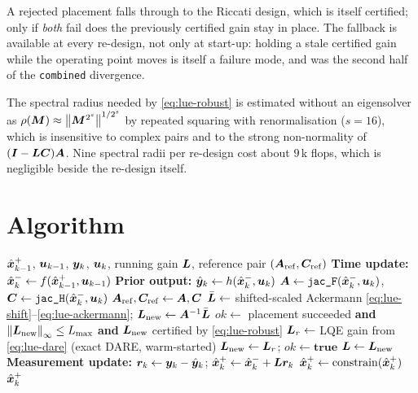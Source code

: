 A rejected placement falls through to the Riccati design, which is itself certified; only if
\emph{both} fail does the previously certified gain stay in place.  The fallback is available at
every re-design, not only at start-up: holding a stale certified gain while the operating point
moves is itself a failure mode, and was the second half of the \texttt{combined} divergence.

The spectral radius needed by \eqref{eq:lue-robust} is estimated without an eigensolver as
$\rho(\bm{M})\approx\left\lVert \bm{M}^{2^s} \right\rVert^{1/2^s}$ by repeated squaring with renormalisation ($s=16$),
which is insensitive to complex pairs and to the strong non-normality of $(\bm{I}-\bm{L}\bm{C})\bm{A}$.
Nine spectral radii per re-design cost about $9\,$k flops, which is negligible beside the
re-design itself.

\section{Algorithm}
\begin{algorithm}[H]
\caption{Luenberger --- one sampling period}
\begin{algorithmic}[1]
\Require $\hat{\bm{x}}^{+}_{k-1}$, $\bm{u}_{k-1}$, $\bm{y}_k$, $\bm{u}_k$, running gain $\bm{L}$, reference pair $(\bm{A}_{\mathrm{ref}},\bm{C}_{\mathrm{ref}})$
\State \textbf{Time update:} $\hat{\bm{x}}^{-}_k \gets f(\hat{\bm{x}}^{+}_{k-1},\bm{u}_{k-1})$
\State \textbf{Prior output:} $\hat{\bm{y}}_k \gets h(\hat{\bm{x}}^{-}_k, \bm{u}_k)$
\State $\bm{A} \gets \texttt{jac\_F}(\hat{\bm{x}}^{-}_k,\bm{u}_k)$, \quad $\bm{C} \gets \texttt{jac\_H}(\hat{\bm{x}}^{-}_k,\bm{u}_k)$
  \State $\bm{A}_{\mathrm{ref}},\bm{C}_{\mathrm{ref}} \gets \bm{A},\bm{C}$
  \State $\bar{\bm{L}} \gets$ shifted-scaled Ackermann \eqref{eq:lue-shift}--\eqref{eq:lue-ackermann}; \quad $\bm{L}_{\mathrm{new}} \gets \bm{A}^{-1}\bar{\bm{L}}$
  \State $ok \gets$ placement succeeded \textbf{and} $\left\lVert \bm{L}_{\mathrm{new}} \right\rVert_\infty \le L_{\max}$ \textbf{and} $\bm{L}_{\mathrm{new}}$ certified by \eqref{eq:lue-robust}
     \State $\bm{L}_r \gets$ LQE gain from \eqref{eq:lue-dare} (exact DARE, warm-started)
        \State $\bm{L}_{\mathrm{new}} \gets \bm{L}_r$; \quad $ok \gets \textbf{true}$
     \EndIf
  \EndIf
   \State $\bm{L} \gets \bm{L}_{\mathrm{new}}$  \EndIf
\EndIf
\State \textbf{Measurement update:} $\bm{r}_k \gets \bm{y}_k - \hat{\bm{y}}_k$; \quad $\hat{\bm{x}}^{+}_k \gets \hat{\bm{x}}^{-}_k + \bm{L}\bm{r}_k$
\State $\hat{\bm{x}}^{+}_k \gets \operatorname{constrain}(\hat{\bm{x}}^{+}_k)$
\Ensure $\hat{\bm{x}}^{+}_k$
\end{algorithmic}
\end{algorithm}

